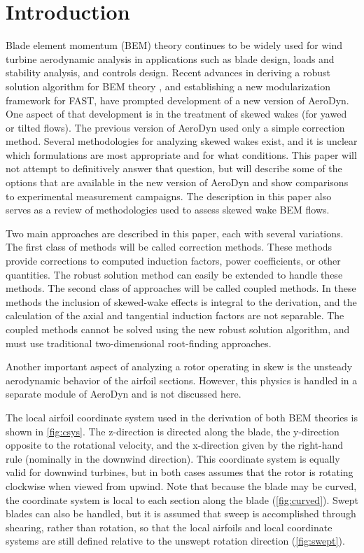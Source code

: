 \documentclass[]{aiaa-tc}%
\begin{document}
\section{Introduction}

Blade element momentum (BEM) theory continues to be widely used for wind turbine aerodynamic analysis in applications such as blade design, loads and stability analysis, and controls design.  Recent advances in deriving a robust solution algorithm for BEM theory \cite{Ning2013a}, and establishing a new modularization framework for FAST\cite{Jonkman2013}, have prompted development of a new version of AeroDyn.  One aspect of that development is in the treatment of skewed wakes (for yawed or tilted flows).  The previous version of AeroDyn used only a simple correction method.  Several methodologies for analyzing skewed wakes exist, and it is unclear which formulations are most appropriate and for what conditions.  This paper will not attempt to definitively answer that question, but will describe some of the options that are available in the new version of AeroDyn and show comparisons to experimental measurement campaigns.  The description in this paper also serves as a review of methodologies used to assess skewed wake BEM flows.

Two main approaches are described in this paper, each with several variations.  The first class of methods will be called correction methods.  These methods provide corrections to computed induction factors, power coefficients, or other quantities.  The robust solution method can easily be extended to handle these methods.  The second class of approaches will be called coupled methods.  In these methods the inclusion of skewed-wake effects is integral to the derivation, and the calculation of the axial and tangential induction factors are not separable.  The coupled methods cannot be solved using the new robust solution algorithm, and must use traditional two-dimensional root-finding approaches.

Another important aspect of analyzing a rotor operating in skew is the unsteady aerodynamic behavior of the airfoil sections.  However, this physics is handled in a separate module of AeroDyn and is not discussed here.  

The local airfoil coordinate system used in the derivation of both BEM theories is shown in \cref{fig:csys}.  The z-direction is directed along the blade, the y-direction opposite to the rotational velocity, and the x-direction given by the right-hand rule (nominally in the downwind direction).  This coordinate system is equally valid for downwind turbines, but in both cases assumes that the rotor is rotating clockwise when viewed from upwind.  Note that because the blade may be curved, the coordinate system is local to each section along the blade (\cref{fig:curved}).  Swept blades can also be handled, but it is assumed that sweep is accomplished through shearing, rather than rotation, so that the local airfoils and local coordinate systems are still defined relative to the unswept rotation direction (\cref{fig:swept}).
\end{document}

